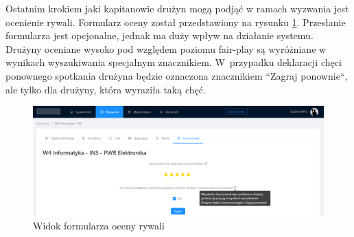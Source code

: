 Ostatnim krokiem jaki kapitanowie drużyn mogą podjąć w ramach wyzwania jest ocenienie rywali. Formularz oceny został przedstawiony na rysunku \ref{fig:ss--match-10}. Przesłanie formularza jest opcjonalne, jednak ma duży wpływ na działanie systemu. Drużyny oceniane wysoko pod względem poziomu fair-play są wyróżniane w wynikach wyszukiwania specjalnym znacznikiem. W~przypadku deklaracji chęci ponownego spotkania drużyna będzie oznaczona znacznikiem ``Zagraj ponownie``, ale tylko dla drużyny, która wyraziła taką chęć.

\begin{figure}[H]
\centering
\includegraphics[width=\linewidth]{065-dzialanie/rys/ss-match-10.png}
\caption{Widok formularza oceny rywali}
\label{fig:ss--match-10}
\end{figure}
